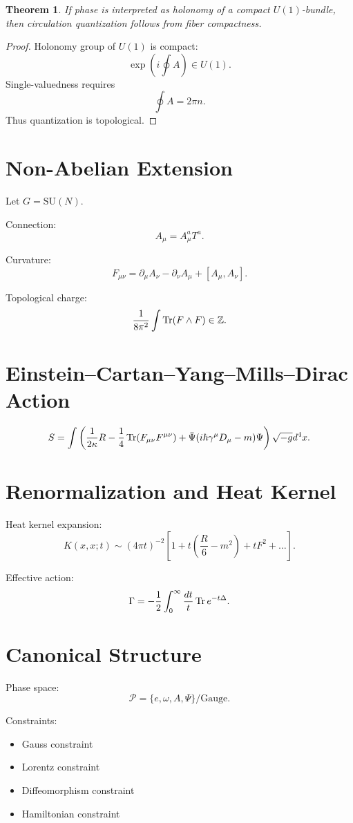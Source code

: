 \documentclass[11pt]{article}
\newtheorem{theorem}{Theorem}[section]
\theoremstyle{remark}
\newcommand{\SU}{\mathrm{SU}}
\begin{document}
\begin{theorem}
If phase is interpreted as holonomy of a compact $U(1)$-bundle, then circulation quantization follows from fiber compactness.
\end{theorem}

\begin{proof}
Holonomy group of $U(1)$ is compact:
\[
\exp\left(i\oint A\right)\in U(1).
\]
Single-valuedness requires
\[
\oint A = 2\pi n.
\]
Thus quantization is topological.
\end{proof}

\section{Non-Abelian Extension}

Let $G=\SU(N)$.

Connection:
\[
A_\mu = A_\mu^a T^a.
\]

Curvature:
\[
F_{\mu\nu} = \partial_\mu A_\nu - \partial_\nu A_\mu + [A_\mu,A_\nu].
\]

Topological charge:
\[
\frac{1}{8\pi^2}\int \Tr(F\wedge F)\in\mathbb{Z}.
\]

\section{Einstein--Cartan--Yang--Mills--Dirac Action}

\[
S = \int \left(
\frac{1}{2\kappa}R
- \frac14 \Tr(F_{\mu\nu}F^{\mu\nu})
+ \bar\Psi(i\hbar\gamma^\mu D_\mu - m)\Psi
\right)\sqrt{-g} d^4x.
\]

\section{Renormalization and Heat Kernel}

Heat kernel expansion:
\[
K(x,x;t) \sim (4\pi t)^{-2}\left[1+t\left(\frac{R}{6}-m^2\right)+t F^2+\dots\right].
\]

Effective action:
\[
\Gamma = -\frac12 \int_0^\infty \frac{dt}{t} \Tr e^{-t\Delta}.
\]

\section{Canonical Structure}

Phase space:
\[
\mathcal{P} = \{e,\omega,A,\Psi\}/\text{Gauge}.
\]

Constraints:
\begin{itemize}
\item Gauss constraint
\item Lorentz constraint
\item Diffeomorphism constraint
\item Hamiltonian constraint
\end{itemize}
\end{document}
